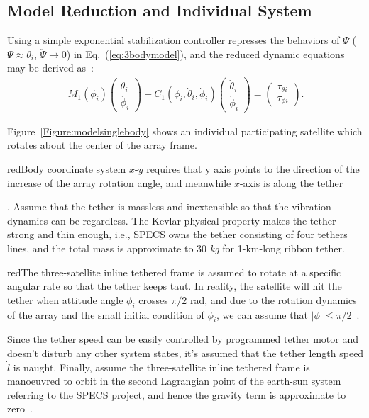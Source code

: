 \subsection{Model Reduction and Individual System}
Using a simple exponential stabilization controller represses the behaviors of $\Psi$ ($\Psi\approx\theta_i$, $\ddot\Psi\rightarrow 0$) in Eq.~(\ref{eq:3bodymodel}), and the reduced dynamic equations may be derived as~\cite{chung2007nonlinear,huang2015nonlinear}:
\begin{align}
M_1(\phi_i)
\begin{pmatrix}
\ddot{\theta}_i\\
\ddot{\phi}_i
\end{pmatrix}
+C_1(\phi_i,\dot{\theta}_i,\dot{\phi}_i)
\begin{pmatrix}
\dot{\theta}_i\\
\dot{\phi}_i
\end{pmatrix}
=
\begin{pmatrix}
\tau_{\theta i}\\
\tau_{\phi i}
\end{pmatrix}.\label{eq:3bodyreduce}
\end{align}\par
Figure~\ref{Figure:modelsinglebody} shows an individual participating satellite which rotates about the center of the array frame. \begin{color}{red}Body coordinate system $x$-$y$ requires that y axis points to the direction of the increase of the array rotation angle, and meanwhile $x$-axis is along the tether\end{color}. Assume that the tether is massless and inextensible so that the vibration dynamics can be regardless. The Kevlar physical property makes the tether strong and thin enough, i.e., SPECS owns the tether consisting of four tethers lines, and the total mass is approximate to 30 \textit{kg} for 1-km-long ribbon tether\cite{chung2007nonlinear1}. \begin{color}{red}The three-satellite inline tethered frame is assumed to rotate at a specific angular rate so that the tether keeps taut. In reality, the satellite will hit the tether when attitude angle $\phi_i$ crosses $\pi/2$ rad, and due to the rotation dynamics of the array and the small initial condition of $\phi_i$, we can assume that $\vert \phi\vert\le \pi/2$~\cite{chung2007nonlinear1}.\end{color}  Since the tether speed can be easily controlled by programmed tether motor and doesn't disturb any other system states, it's assumed that the tether length speed $\dot l$ is naught. Finally, assume the three-satellite inline tethered frame is manoeuvred to orbit in the second Lagrangian point of the earth-sun system referring to the SPECS project, and hence the gravity term is approximate to zero~\cite{lorenzini2006far}.\par
